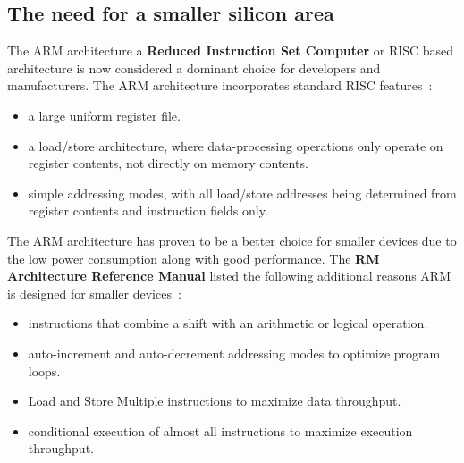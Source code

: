 \documentclass[11pt]{report}
\begin{document}
\subsection{The need for a smaller silicon area}
\begin{onehalfspace}
The ARM architecture a \textbf{Reduced Instruction Set Computer} or RISC based architecture is now considered a dominant choice for developers and manufacturers. The ARM architecture incorporates standard RISC features~\citep[A1-2]{referenceB}:
\end{onehalfspace}

\begin{itemize}
\item a large uniform register file.
\item a load/store architecture, where data-processing operations only operate on register contents, not directly on memory contents.
\item simple addressing modes, with all load/store addresses being determined from register contents and instruction fields only.
\end{itemize}
\begin{onehalfspace}
The ARM architecture has proven to be a better choice for smaller devices due to the low power consumption along with good performance. The \textbf{RM Architecture Reference Manual} listed the following additional reasons ARM is designed for smaller devices~\citep[A1-2]{referenceB}:
\end{onehalfspace}
\begin{itemize}
\item instructions that combine a shift with an arithmetic or logical operation.
\item auto-increment and auto-decrement addressing modes to optimize program loops.
\item Load and Store Multiple instructions to maximize data throughput.
\item conditional execution of almost all instructions to maximize execution throughput.
\end{itemize}
\end{document}
